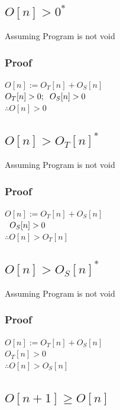 \documentclass[11pt]{article}
\begin{document}
\subsection{$O[n] > 0^*$}
Assuming Program is not void
\subsubsection{Proof}
\begin{center}
$
O[n] := O_T[n] + O_S[n]
$
\\ \vspace{3mm}
$
O_T[n] > 0; \hspace{2mm} O_S[n] > 0
$
\\ \vspace{3mm}
$
\therefore O[n] > 0
$
\end{center}

\subsection{$O[n] > O_T[n]^*$}
Assuming Program is not void
\subsubsection{Proof}
\begin{center}
$
O[n] := O_T[n] + O_S[n]
$
\\ \vspace{3mm}
$
\hspace{2mm} O_S[n] > 0
$
\\ \vspace{3mm}
$
\therefore O[n] > O_T[n]
$
\end{center}

\subsection{$O[n] > O_S[n]^*$}
Assuming Program is not void
\subsubsection{Proof}
\begin{center}
$
O[n] := O_T[n] + O_S[n]
$
\\ \vspace{3mm}
$
O_T[n] > 0
$
\\ \vspace{3mm}
$
\therefore O[n] > O_S[n]
$
\end{center}


\subsection{$O[n+1] \geq O[n]$}
\end{document}
